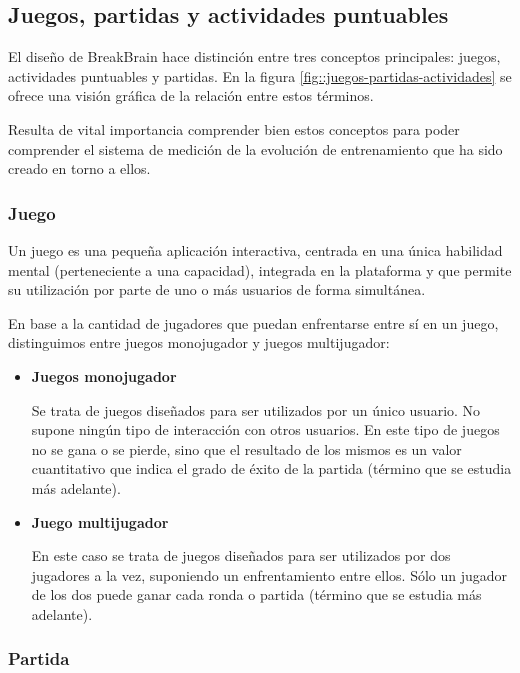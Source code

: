 \subsection{Juegos, partidas y actividades puntuables}
\label{sec::juegos-partidas-actividades}

El diseño de BreakBrain hace distinción entre tres conceptos principales: juegos, actividades puntuables y partidas. En la figura \ref{fig::juegos-partidas-actividades} se ofrece una visión gráfica de la relación entre estos términos.

Resulta de vital importancia comprender bien estos conceptos para poder comprender el sistema de medición de la evolución de entrenamiento que ha sido creado en torno a ellos.

\subsubsection{Juego}

Un juego es una pequeña aplicación interactiva, centrada en una única habilidad mental (perteneciente a una capacidad), integrada en la plataforma y que permite su utilización por parte de uno o más usuarios de forma simultánea.

En base a la cantidad de jugadores que puedan enfrentarse entre sí en un juego, distinguimos entre juegos monojugador y juegos multijugador:

\begin{itemize}
\item {\bf Juegos monojugador}

Se trata de juegos diseñados para ser utilizados por un único usuario. No supone ningún tipo de interacción con otros usuarios. En este tipo de juegos no se gana o se pierde, sino que el resultado de los mismos es un valor cuantitativo que indica el grado de éxito de la partida (término que se estudia más adelante).

\item {\bf Juego multijugador}

En este caso se trata de juegos diseñados para ser utilizados por dos jugadores a la vez, suponiendo un enfrentamiento entre ellos. Sólo un jugador de los dos puede ganar cada ronda o partida (término que se estudia más adelante).

\end{itemize}

\subsubsection{Partida}

